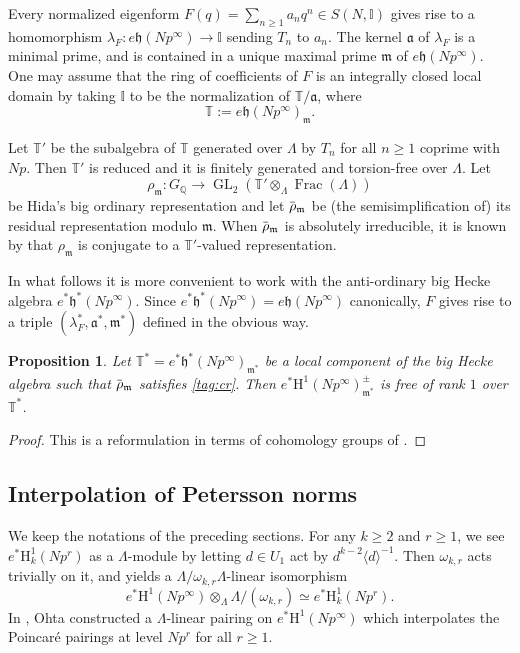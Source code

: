 \documentclass[12pt]{amsart}
\newcommand\bI{\mathbb{I}}
\newcommand\bQ{\mathbb{Q}}
\newcommand\bT{\mathbb{T}}
\newcommand\ga{\mathfrak{a}}
\newcommand\gh{\mathfrak{h}}
\newcommand\gm{\mathfrak{m}}
\newcommand{\ob}[1]{\mkern 1.5mu\overline{\mkern-1.5mu#1\mkern-1.5mu}\mkern 1.5mu}
\DeclareMathOperator{\Frac}{Frac}
\DeclareMathOperator{\GL}{GL}
\newcommand{\HH}{\mathrm{H}}
\theoremstyle{defstyle}
\theoremstyle{thmstyle}
\newtheorem{proposition}[subsubsection]{Proposition}
\begin{document}
Every normalized eigenform $F(q)=\sum_{n\geq 1}a_nq^n \in S(N,\bI)$ gives rise to a homomorphism $\lambda_F\colon e\gh(Np^\infty) \to \bI$ sending $T_n$ to $a_n$. The kernel $\ga$ of $\lambda_F$ is a minimal prime, and is contained in a unique maximal prime $\gm$ of $e\gh(Np^\infty)$. One may assume that the ring of coefficients of $F$ is an integrally closed local domain by taking $\bI$ to be the normalization of $\bT/\ga$, where 
\[\bT:=e\gh(Np^\infty)_\gm.\]

Let $\bT'$ be the subalgebra of $\bT$ generated over $\Lambda$ by $T_n$ for all $n\geq1$ coprime with $Np$. Then $\bT'$ is reduced and it is finitely generated and torsion-free over $\Lambda$. Let 
\[\rho_\gm \colon G_{\bQ} \to \GL_2(\bT'\otimes_{\Lambda}\Frac(\Lambda))\]
be Hida's big ordinary representation and let $\ob{\rho}_\gm$ be (the semisimplification of) its residual representation modulo $\gm$. When $\ob{\rho}_\gm$ is absolutely irreducible, it is known by \cite[Théorème 1]{nyssen1996pseudo} that $\rho_\gm$ is conjugate to a $\bT'$-valued representation. 

In what follows it is more convenient to work with the anti-ordinary big Hecke algebra $e^*\gh^*(Np^\infty)$. Since $e^*\gh^*(Np^\infty)=e\gh(Np^\infty)$ canonically, $F$ gives rise to a triple $(\lambda_F^*,\ga^*,\gm^*)$ defined in the obvious way. 
\begin{proposition}\label{prop:EPW}
	Let $\bT^*=e^*\gh^*(Np^\infty)_{\gm^*}$ be a local component of the big Hecke algebra such that $\ob{\rho}_\gm$ satisfies \eqref{tag:cr}. Then $e^*\HH^1(Np^\infty)^\pm_{\gm^*}$ is free of rank $1$ over $\bT^*$.
\end{proposition}
\begin{proof}
	This is a reformulation in terms of cohomology groups of \cite[Prop. 3.3.1]{emerton2006variation}.
\end{proof}

\subsection{Interpolation of Petersson norms}\label{sec:interpolation_petersson}
We keep the notations of the preceding sections. For any $k\geq 2$ and $r\geq 1$, we see $e^*\HH_k^1(Np^r)$ as a $\Lambda$-module by letting $d\in U_1$ act  by $ d^{k-2}\langle d \rangle^{-1}$. 
Then $\omega_{k,r}$ acts trivially on it, and \cite[Thm. 1.4.3 (ii)]{ohtacrelle} yields a $\Lambda/\omega_{k,r}\Lambda$-linear isomorphism
\begin{equation}\label{eq:control_theorem_cohomology}
	e^*\HH^1(Np^\infty) \otimes_\Lambda \Lambda/(\omega_{k,r}) \simeq e^*\HH_k^1(Np^r).
\end{equation}
In \cite[Thm. 4.2.5]{ohtacrelle}, Ohta constructed a $\Lambda$-linear pairing on $e^*\HH^1(Np^\infty)$ which interpolates the Poincaré pairings at level $Np^r$ for all $r\geq 1$. 
\end{document}

